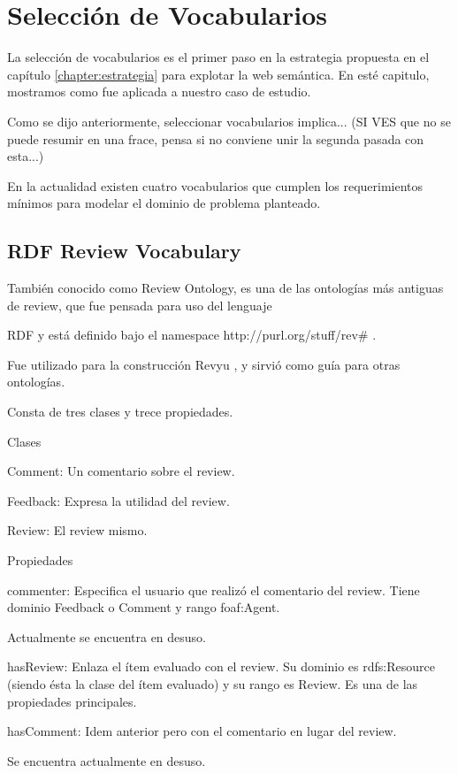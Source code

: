 \chapter{Selección de Vocabularios}
\label{chapter:seleccion}
La selección de vocabularios es el primer paso en la estrategia propuesta en el capítulo \ref{chapter:estrategia} para explotar la web semántica. En esté capitulo, mostramos como fue aplicada a nuestro caso de estudio.

Como se dijo anteriormente, seleccionar vocabularios implica...  (SI VES que no se puede resumir en una frace, pensa si no conviene unir la segunda pasada con esta...)

En la actualidad existen cuatro vocabularios que cumplen los requerimientos mínimos para modelar el dominio de problema planteado.

\section{RDF Review Vocabulary}
\label{section:review-ontology}

También conocido como Review Ontology, es una de las ontologías más antiguas de review, que fue pensada para uso del lenguaje 

RDF y está definido bajo el namespace http://purl.org/stuff/rev\# .

Fue utilizado para la construcción Revyu , y sirvió como guía para otras ontologías.

Consta de tres clases y trece propiedades.

Clases

Comment: Un comentario sobre el review. 

Feedback: Expresa la utilidad del review. 


Review: El review mismo. 


Propiedades


commenter: Especifica el usuario que realizó el comentario del review. Tiene dominio Feedback o Comment y rango foaf:Agent.


Actualmente se encuentra en desuso.


hasReview: Enlaza el ítem evaluado con el review. Su dominio es rdfs:Resource (siendo ésta la clase del ítem evaluado) y su rango es Review. Es una de 
las propiedades principales. 


hasComment: Idem anterior pero con el comentario en lugar del review.

Se encuentra actualmente en desuso.


